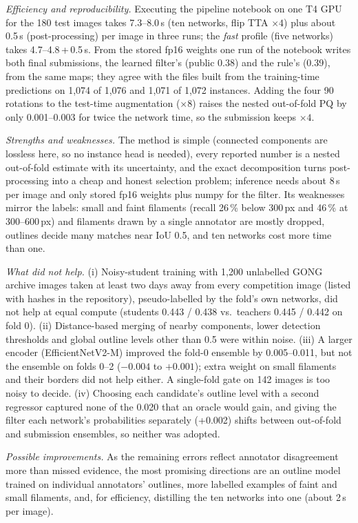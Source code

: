 \documentclass[sigconf]{acmart}
\begin{document}
\emph{Efficiency and reproducibility.} Executing the pipeline notebook on one T4 GPU for the 180 test images takes 7.3--8.0\,s (ten networks, flip TTA $\times4$) plus about 0.5\,s (post-processing) per image in three runs; the \emph{fast} profile (five networks) takes 4.7--4.8\,+\,0.5\,s. From the stored fp16 weights one run of the notebook writes both final submissions, the learned filter's (public 0.38) and the rule's (0.39), from the same maps; they agree with the files built from the training-time predictions on 1,074 of 1,076 and 1,071 of 1,072 instances. Adding the four 90\textdegree{} rotations to the test-time augmentation ($\times8$) raises the nested out-of-fold PQ by only 0.001--0.003 for twice the network time, so the submission keeps $\times4$.

\emph{Strengths and weaknesses.} The method is simple (connected components are lossless here, so no instance head is needed), every reported number is a nested out-of-fold estimate with its uncertainty, and the exact decomposition turns post-processing into a cheap and honest selection problem; inference needs about 8\,s per image and only stored fp16 weights plus numpy for the filter. Its weaknesses mirror the labels: small and faint filaments (recall 26\,\% below 300\,px and 46\,\% at 300--600\,px) and filaments drawn by a single annotator are mostly dropped, outlines decide many matches near IoU 0.5, and ten networks cost more time than one.

\emph{What did not help.} (i) Noisy-student training \cite{xie2020noisystudent} with 1,200 unlabelled GONG archive images taken at least two days away from every competition image (listed with hashes in the repository), pseudo-labelled by the fold's own networks, did not help at equal compute (students 0.443 / 0.438 vs.\ teachers 0.445 / 0.442 on fold 0). (ii) Distance-based merging of nearby components, lower detection thresholds and global outline levels other than 0.5 were within noise. (iii) A larger encoder (EfficientNetV2-M) improved the fold-0 ensemble by 0.005--0.011, but not the ensemble on folds 0--2 ($-0.004$ to $+0.001$); extra weight on small filaments and their borders did not help either. A single-fold gate on 142 images is too noisy to decide. (iv) Choosing each candidate's outline level with a second regressor captured none of the 0.020 that an oracle would gain, and giving the filter each network's probabilities separately (+0.002) shifts between out-of-fold and submission ensembles, so neither was adopted.

\emph{Possible improvements.} As the remaining errors reflect annotator disagreement more than missed evidence, the most promising directions are an outline model trained on individual annotators' outlines, more labelled examples of faint and small filaments, and, for efficiency, distilling the ten networks into one (about 2\,s per image).
\end{document}

